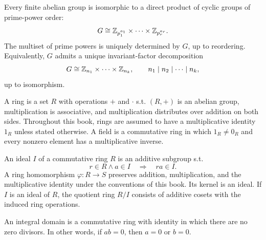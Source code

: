     \begin{theorem}
        Every finite abelian group is isomorphic to a direct product of cyclic
        groups of prime-power order:
        \[
            G\cong
            \mathbb{Z}_{p_1^{a_1}}\times\cdots\times\mathbb{Z}_{p_r^{a_r}}.
        \]
        The multiset of prime powers is uniquely determined by $G$, up to
        reordering. Equivalently, $G$ admits a unique invariant-factor
        decomposition
        \[
            G\cong\mathbb{Z}_{n_1}\times\cdots\times\mathbb{Z}_{n_k},
            \qquad
            n_1\mid n_2\mid\cdots\mid n_k,
        \]
        up to isomorphism.
    \end{theorem}

    \begin{definition}
        A ring is a set $R$ with operations $+$ and $\cdot$ s.t.
        $(R,+)$ is an abelian group, multiplication is associative, and
        multiplication distributes over addition on both sides. Throughout this
        book, rings are assumed to have a multiplicative identity $1_R$ unless
        stated otherwise. A field is a commutative ring in which $1_R\neq0_R$
        and every nonzero element has a multiplicative inverse.
    \end{definition}


    \begin{definition}
        An ideal $I$ of a commutative ring $R$ is an additive subgroup s.t.
        \[
            r\in R\land a\in I
            \quad\Longrightarrow\quad
            ra\in I.
        \]
        A ring homomorphism $\varphi:R\to S$ preserves addition,
        multiplication, and the multiplicative identity under the conventions
        of this book. Its kernel is an ideal. If $I$ is an ideal of $R$, the
        quotient ring $R/I$ consists of additive cosets with the induced ring
        operations.
    \end{definition}

    \begin{definition}
        An integral domain is a commutative ring with identity in which there are
        no zero divisors. In other words, if $ab=0$, then $a=0$ or $b=0$.
    \end{definition}


